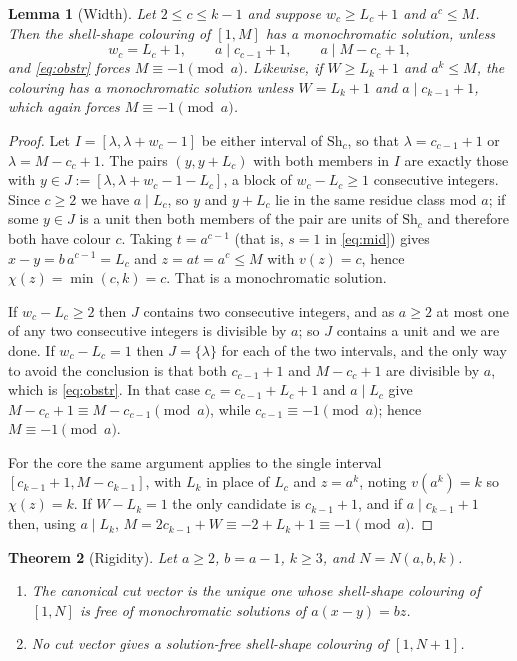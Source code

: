 \documentclass{amsart}
\newtheorem{theorem}{Theorem}
\newtheorem{lemma}[theorem]{Lemma}
\theoremstyle{definition}
\newcommand{\Sh}{\mathrm{Sh}}
\begin{document}
\begin{lemma}[Width]\label{lem:width}
Let $2\le c\le k-1$ and suppose $w_c\ge L_c+1$ and $a^{c}\le M$.  Then the
shell-shape colouring of $[1,M]$ has a monochromatic solution, unless
\begin{equation}\label{eq:obstr}
  w_c=L_c+1,\qquad a\mid c_{c-1}+1,\qquad a\mid M-c_c+1 ,
\end{equation}
and \eqref{eq:obstr} forces $M\equiv-1\pmod a$.  Likewise, if $W\ge L_k+1$ and
$a^{k}\le M$, the colouring has a monochromatic solution unless $W=L_k+1$ and
$a\mid c_{k-1}+1$, which again forces $M\equiv-1\pmod a$.
\end{lemma}

\begin{proof}
Let $I=[\lambda,\lambda+w_c-1]$ be either interval of $\Sh_c$, so that
$\lambda=c_{c-1}+1$ or $\lambda=M-c_c+1$.  The pairs $(y,y+L_c)$ with both
members in $I$ are exactly those with
$y\in J:=[\lambda,\lambda+w_c-1-L_c]$, a block of $w_c-L_c\ge1$ consecutive
integers.  Since $c\ge2$ we have $a\mid L_c$, so $y$ and $y+L_c$ lie in the
same residue class mod $a$; if some $y\in J$ is a unit then both members of the
pair are units of $\Sh_c$ and therefore both have colour $c$.  Taking
$t=a^{c-1}$ (that is, $s=1$ in \eqref{eq:mid}) gives $x-y=b\,a^{c-1}=L_c$ and
$z=at=a^{c}\le M$ with $v(z)=c$, hence $\chi(z)=\min(c,k)=c$.  That is a
monochromatic solution.

If $w_c-L_c\ge2$ then $J$ contains two consecutive integers, and as $a\ge2$ at
most one of any two consecutive integers is divisible by $a$; so $J$ contains a
unit and we are done.  If $w_c-L_c=1$ then $J=\{\lambda\}$ for each of the two
intervals, and the only way to avoid the conclusion is that both $c_{c-1}+1$
and $M-c_c+1$ are divisible by $a$, which is \eqref{eq:obstr}.  In that case
$c_c=c_{c-1}+L_c+1$ and $a\mid L_c$ give $M-c_c+1\equiv M-c_{c-1}\pmod a$,
while $c_{c-1}\equiv-1\pmod a$; hence $M\equiv-1\pmod a$.

For the core the same argument applies to the single interval
$[c_{k-1}+1,M-c_{k-1}]$, with $L_k$ in place of $L_c$ and $z=a^{k}$, noting
$v(a^{k})=k$ so $\chi(z)=k$.  If $W-L_k=1$ the only candidate is $c_{k-1}+1$,
and if $a\mid c_{k-1}+1$ then, using $a\mid L_k$,
$M=2c_{k-1}+W\equiv-2+L_k+1\equiv-1\pmod a$.
\end{proof}

\begin{theorem}[Rigidity]\label{thm:rigid}
Let $a\ge2$, $b=a-1$, $k\ge3$, and $N=N(a,b,k)$.
\begin{enumerate}
\item The canonical cut vector is the unique one whose shell-shape colouring of
      $[1,N]$ is free of monochromatic solutions of $a(x-y)=bz$.
\item No cut vector gives a solution-free shell-shape colouring of $[1,N+1]$.
\end{enumerate}
\end{theorem}
\end{document}
